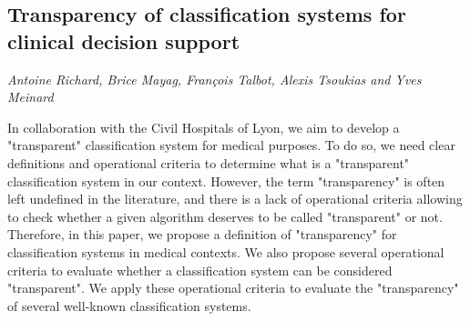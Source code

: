 \documentclass[../booklet.tex]{subfiles}
\begin{document}
\subsection[Transparency of classification systems for clinical decision support. {\it Antoine Richard, Brice Mayag, François Talbot, Alexis Tsoukias and Yves Meinard}]{Transparency of classification systems for clinical decision support}
    

\begin{center}
  {\it Antoine Richard, Brice Mayag, François Talbot, Alexis Tsoukias and Yves Meinard}
\end{center}



  In collaboration with the Civil Hospitals of Lyon, we aim
to develop a "transparent" classification system for medical purposes.
To do so, we need clear definitions and operational criteria to determine
what is a "transparent" classification system in our context.
However, the term "transparency" is often left undefined
in the literature, and there is a lack of operational criteria
allowing to check whether a given algorithm deserves to be called
"transparent" or not.
Therefore, in this paper, we propose a definition of "transparency"
for classification systems in medical contexts.
We also propose several operational criteria to evaluate
whether a classification system can be considered 
"transparent".
We apply these operational criteria to evaluate the 
"transparency" of several well-known classification systems.

\end{document}
